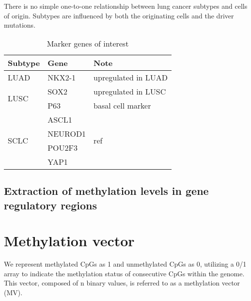 \documentclass[12pt,letterpaper]{article}
\begin{document}
There is no simple one-to-one relationship between lung cancer subtypes and cells of origin. Subtypes are
influenced by both the originating cells and the driver mutations\cite{ferone_cells_2020}.

\begin{table}[htbp]
    \begin{center}
        \caption{ Marker genes of interest}
        \begin{tabular}{|l|l|l|}
            \hline
            \textbf{Subtype}      & \textbf{Gene} & \textbf{Note}                              \\
            \hline
            LUAD                  & NKX2-1        & upregulated in LUAD                        \\
            \hline
            \multirow{2}{*}{LUSC} & SOX2          & upregulated in LUSC                        \\
            \cline{2-3}           & P63           & basal cell marker                          \\
            \hline
            \multirow{4}{*}{SCLC} & ASCL1         & \multirow{4}{*}{ref\cite{baine_sclc_2020}} \\
            \cline{2-2}           & NEUROD1       &                                            \\
            \cline{2-2}           & POU2F3        &                                            \\
            \cline{2-2}           & YAP1          &                                            \\
            \hline
        \end{tabular}
    \end{center}
    \label{tab:gene-marker}
\end{table}
\subsection{Extraction of methylation levels in gene regulatory regions}\label{sec:gene-methylation}

\section{Methylation vector}\label{sec:vector}

We represent methylated CpGs as 1 and unmethylated CpGs as 0, utilizing a 
0/1 array to indicate the methylation status of consecutive CpGs within the 
genome. This vector, composed of n binary values, is referred to as a 
methylation vector (MV).
\end{document}
